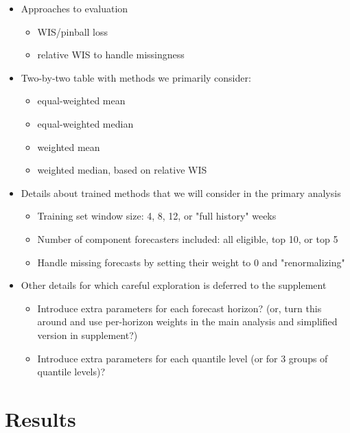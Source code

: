 \documentclass[review]{elsarticle}
\begin{document}
\begin{itemize}
  \item Approaches to evaluation
  \begin{itemize}
    \item WIS/pinball loss
    \item relative WIS to handle missingness
  \end{itemize}
  \item Two-by-two table with methods we primarily consider:
  \begin{itemize}
    \item equal-weighted mean
    \item equal-weighted median
    \item weighted mean
    \item weighted median, based on relative WIS
  \end{itemize}
  \item Details about trained methods that we will consider in the primary analysis
  \begin{itemize}
    \item Training set window size: 4, 8, 12, or "full history" weeks
    \item Number of component forecasters included: all eligible, top 10, or top 5
    \item Handle missing forecasts by setting their weight to 0 and "renormalizing"
  \end{itemize}
  \item Other details for which careful exploration is deferred to the supplement
  \begin{itemize}
    \item Introduce extra parameters for each forecast horizon? (or, turn this around and use per-horizon weights in the main analysis and simplified version in supplement?)
    \item Introduce extra parameters for each quantile level (or for 3 groups of quantile levels)?
  \end{itemize}
\end{itemize}

\section{Results}
\end{document}
